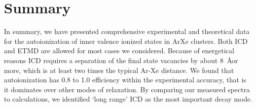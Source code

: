 \section{Summary}
%
In summary, we have presented comprehensive experimental and theoretical data for the autoionization of inner valence ionized states in ArXe clusters.
Both ICD and ETMD are allowed for most cases we considered.
Because of energetical reasons ICD requires a separation of the final state vacancies by about 8~\AA or more, which is at least two times the typical Ar-Xe distance.
We found that autoionization has 0.8 to 1.0 efficiency within the experimental accuracy, that is it dominates over other modes of relaxation.
By comparing our measured spectra to calculations, we identified `long range' ICD as the most important decay mode.